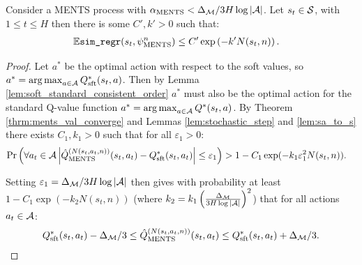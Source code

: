     \begin{lemma} \label{lem:ments_imm_simple_regret}
        Consider a MENTS process with ${\alpha_{{\textnormal{MENTS}}}}<\Delta_{\mathcal{M}}/3H\log |\mathcal{A}|$.  Let $s_t\in\mathcal{S}$, with $1\leq t \leq H$ then there is some $C',k'>0$ such that:
        \begin{align}
            \mathbb{E} {\textnormal{\texttt{sim\_regr}}}(s_{t},\psi^{n}_{{\textnormal{MENTS}}}) &\leq C'\exp\left( -k' N(s_{t},n) \right).
        \end{align}
    \end{lemma}
    \begin{proof}

        Let $a^*$ be the optimal action with respect to the soft values, so $a^*=\operatorname*{arg\,max}_{a\in\mathcal{A}} Q_{{\textnormal{sft}}}^*(s_t,a)$. Then by Lemma \ref{lem:soft_standard_consistent_order} $a^*$ must also be the optimal action for the standard Q-value function $a^*=\operatorname*{arg\,max}_{a\in\mathcal{A}} Q^*(s_t,a)$. By Theorem \ref{thrm:ments_val_converge} and Lemmas \ref{lem:stochastic_step} and \ref{lem:sa_to_s} there exists $C_1,k_1>0$ such that for all $\varepsilon_1>0$: 
        \begin{align}
            \Pr\left(\forall a_t\in\mathcal{A} \left|{\hat{Q}^{(N(s_t,a_t,n))}_{{\textnormal{MENTS}}}}(s_t,a_t)-Q_{{\textnormal{sft}}}^*(s_t,a_t)\right|\leq \varepsilon_1\right) &> 1-C_1 \exp(-k_1 \varepsilon_1^2 N(s_t,n)).
        \end{align}
        
        Setting $\varepsilon_1=\Delta_{\mathcal{M}}/3H\log |\mathcal{A}|$ then gives with probability at least $1-C_1 \exp(-k_2N(s_t,n))$ (where $k_2=k_1\left(\frac{\Delta_{\mathcal{M}}}{3H\log|\mathcal{A}|}\right)^2$) that for all actions $a_t\in\mathcal{A}$:
        \begin{align}
            Q_{{\textnormal{sft}}}^*(s_t,a_t) - \Delta_{\mathcal{M}}/3 \leq {\hat{Q}^{(N(s_t,a_t,n))}_{{\textnormal{MENTS}}}}(s_t,a_t) \leq Q_{{\textnormal{sft}}}^*(s_t,a_t) + \Delta_{\mathcal{M}}/3.
        \end{align}
        

\end{proof}
